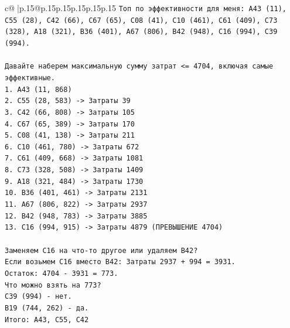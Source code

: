 \documentclass{article}
\begin{document}
{\begin{supertabular}{c@{$\;$}|p{.15\linewidth}@{}p{.15\linewidth}p{.15\linewidth}p{.15\linewidth}p{.15\linewidth}p{.15\linewidth}}
{{{\texttt{Топ по эффективности для меня: A43 (11), C55 (28), C42 (66), C67 (65), C08 (41), C10 (461), C61 (409), C73 (328), A18 (321), B36 (401), A67 (806), B42 (948), C16 (994), C39 (994).} \\
\\ 
\texttt{Давайте наберем максимальную сумму затрат <= 4704, включая самые эффективные.} \\
\texttt{1. A43 (11, 868)} \\
\texttt{2. C55 (28, 583) {-}> Затраты 39} \\
\texttt{3. C42 (66, 808) {-}> Затраты 105} \\
\texttt{4. C67 (65, 389) {-}> Затраты 170} \\
\texttt{5. C08 (41, 138) {-}> Затраты 211} \\
\texttt{6. C10 (461, 780) {-}> Затраты 672} \\
\texttt{7. C61 (409, 668) {-}> Затраты 1081} \\
\texttt{8. C73 (328, 508) {-}> Затраты 1409} \\
\texttt{9. A18 (321, 484) {-}> Затраты 1730} \\
\texttt{10. B36 (401, 461) {-}> Затраты 2131} \\
\texttt{11. A67 (806, 822) {-}> Затраты 2937} \\
\texttt{12. B42 (948, 783) {-}> Затраты 3885} \\
\texttt{13. C16 (994, 915) {-}> Затраты 4879 (ПРЕВЫШЕНИЕ 4704)} \\
\\ 
\texttt{Заменяем C16 на что{-}то другое или удаляем B42?} \\
\texttt{Если возьмем C16 вместо B42: Затраты 2937 + 994 = 3931.} \\
\texttt{Остаток: 4704 {-} 3931 = 773.} \\
\texttt{Что можно взять на 773?} \\
\texttt{C39 (994) {-} нет.} \\
\texttt{B19 (744, 262) {-} да.} \\
\texttt{Итого: A43, C55, C42} \\
            }
        }
    }
     \\ \\


\end{supertabular}}
\end{document}
